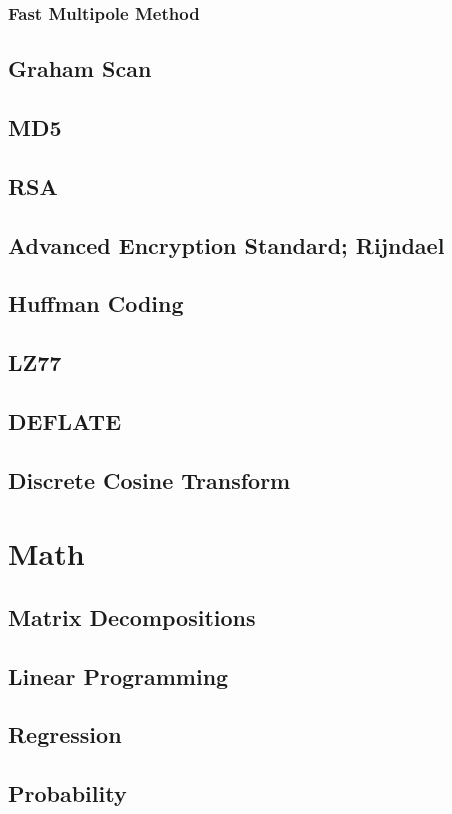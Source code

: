 \documentclass[10pt,letterpaper]{scrartcl}
\begin{document}
\subsubsection{Fast Multipole Method}
\subsection{Graham Scan}
\subsection{MD5}
\subsection{RSA}
\subsection[AES]{Advanced Encryption Standard; Rijndael}
\subsection{Huffman Coding}
\subsection{LZ77}
\subsection{DEFLATE}
\subsection[DCT]{Discrete Cosine Transform}


\newpage\section{Math}
\subsection{Matrix Decompositions}
\subsection{Linear Programming}
\subsection{Regression}
\subsection{Probability}
\end{document}

